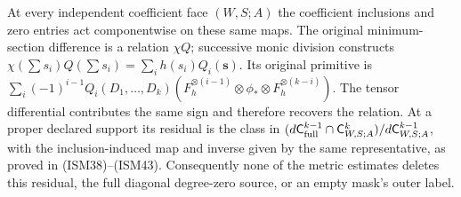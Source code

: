 At every independent coefficient face $(W,S;A)$ the coefficient
inclusions and zero entries act componentwise on these same maps.
The original minimum-section difference is a relation $\chi Q$;
successive monic division constructs
$\chi(\sum s_i)Q(\sum s_i)=\sum_i h(s_i)Q_i(\mathbf s)$.
Its original primitive is
$\sum_i(-1)^{i-1}Q_i(D_1,\ldots,D_k)
 (F_h^{\otimes(i-1)}\otimes\phi_*\otimes F_h^{\otimes(k-i)})$.
The tensor differential contributes the same sign and therefore
recovers the relation. At a proper declared support its residual is
the class in
$(d\mathsf C_{\rm full}^{k-1}\cap\mathsf C_{W,S;A}^k)/
d\mathsf C_{W,S;A}^{k-1}$, with the inclusion-induced map and inverse
given by the same representative, as proved in (ISM38)--(ISM43).
Consequently none of the metric estimates deletes this residual,
the full diagonal degree-zero source, or an empty mask's outer label.
